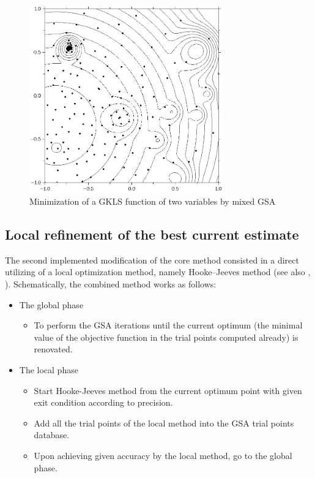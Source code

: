 \documentclass{llncs}
\begin{document}
\begin{figure}
	\center
  \includegraphics[width=0.75\textwidth]{fig3.jpg} 
  \caption{Minimization of a GKLS function of two variables by mixed GSA}
  \label{fig:2}       %
\end{figure} 

\subsection{Local refinement of the best current estimate} \label{hooke}

The second implemented modification of the core method consisted in a direct utilizing of a local optimization method, namely Hooke--Jeeves method \cite{HookeJeeves} (see also \cite{Wilde}, \cite{Himmelblau}). Schematically, the combined method works as follows:


\begin{itemize}
	\item The global phase
	
	\begin{itemize}
		\item To perform the GSA iterations until the current optimum (the minimal value of the objective function in the trial points computed already) is renovated.
	\end{itemize}
	
	\item The local phase
		\begin{itemize}
		\item Start Hooke-Jeeves method from the current optimum point with given exit condition according to precision.
		\item Add all the trial points of the local method into the GSA trial points database.
		\item Upon achieving given accuracy by the local method, go to the global phase.
	\end{itemize}

\end{itemize}
\end{document}
